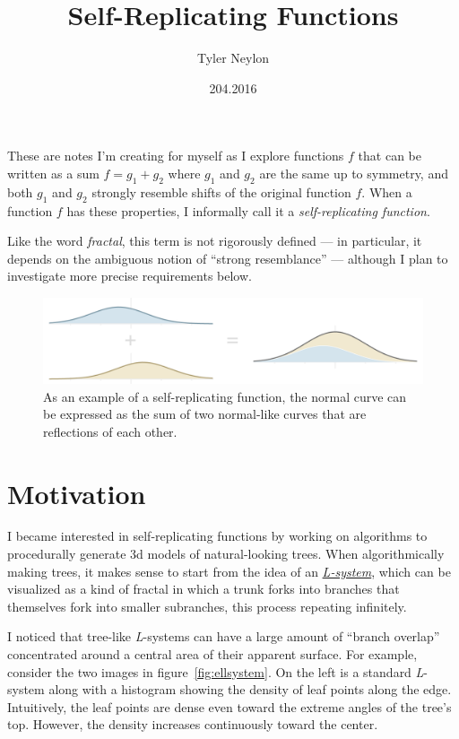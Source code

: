 \documentclass[20pt,]{extarticle}
\title{Self-Replicating Functions}
\author{Tyler Neylon}
\date{204.2016}
\begin{document}
\maketitle

\newcommand{\R}{\mathbb{R}}
\newcommand{\eqnset}[1]{\left.\mbox{$#1$}\quad\quad\right\rbrace}

These are notes I'm creating for myself as I explore functions \(f\)
that can be written as a sum \(f = g_1 + g_2\) where \(g_1\) and \(g_2\)
are the same up to symmetry, and both \(g_1\) and \(g_2\) strongly
resemble shifts of the original function \(f\). When a function \(f\)
has these properties, I informally call it a \emph{self-replicating
function}.

Like the word \emph{fractal}, this term is not rigorously defined --- in
particular, it depends on the ambiguous notion of ``strong resemblance''
--- although I plan to investigate more precise requirements below.

\begin{figure}
\centering
\includegraphics{images/added_normals4.png}
\caption{As an example of a self-replicating function, the normal curve
can be expressed as the sum of two normal-like curves that are
reflections of each other.}\label{fig:added_normals}
\end{figure}

\section{Motivation}\label{motivation}

I became interested in self-replicating functions by working on
algorithms to procedurally generate 3d models of natural-looking trees.
When algorithmically making trees, it makes sense to start from the idea
of an \href{https://en.wikipedia.org/wiki/L-system}{\emph{L-system}},
which can be visualized as a kind of fractal in which a trunk forks into
branches that themselves fork into smaller subranches, this process
repeating infinitely.

I noticed that tree-like \emph{L}-systems can have a large amount of
``branch overlap'' concentrated around a central area of their apparent
surface. For example, consider the two images in
figure~\ref{fig:ellsystem}. On the left is a standard \emph{L}-system
along with a histogram showing the density of leaf points along the
edge. Intuitively, the leaf points are dense even toward the extreme
angles of the tree's top. However, the density increases continuously
toward the center.
\end{document}
